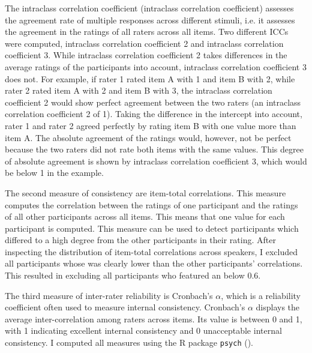 The intraclass correlation coefficient (intraclass correlation coefficient) as\-ses\-ses the agreement rate of multiple responses across different stimuli, i.e. it assesses the agreement in the ratings of all raters across all items. Two different ICCs were computed, intraclass correlation coefficient 2 and intraclass correlation coefficient 3. While intraclass correlation coefficient 2 takes differences in the average ratings of the participants into account, intraclass correlation coefficient 3 does not. For example, if rater 1 rated item A with 1 and item B with 2, while rater 2 rated item A with 2 and item B with 3, the intraclass correlation coefficient 2 would show perfect agreement between the two raters (an intraclass correlation coefficient 2 of 1). Taking the difference in the intercept into account, rater 1 and rater 2 agreed perfectly by rating item B with one value more than item A. The absolute agreement of the ratings would, however, not be perfect because the two raters did not rate both items with the same values. This degree of absolute agreement is shown by intraclass correlation coefficient 3, which would be below 1 in the example.

The second measure of consistency are item-total correlations. This measure computes the correlation between the ratings of one participant and the ratings of all other participants across all items. This means that one value for each participant is computed. This measure can be used to detect participants which differed to a high degree from the other participants in their rating. After inspecting the distribution of item-total correlations across speakers, I excluded all participants whose  was clearly lower than the other participants' correlations. This resulted in excluding all participants who featured an  below 0.6. 

The third measure of inter-rater reliability is Cronbach's $\alpha$, which is a reliability coefficient often used to measure internal consistency. Cronbach's $\alpha$ displays the average inter-correlation among raters across items. Its value is between 0 and 1, with 1 indicating excellent internal consistency and 0 unacceptable internal consistency. 
I computed all measures using the R package \texttt{psych} (\citealt{Revelle.2017}).





